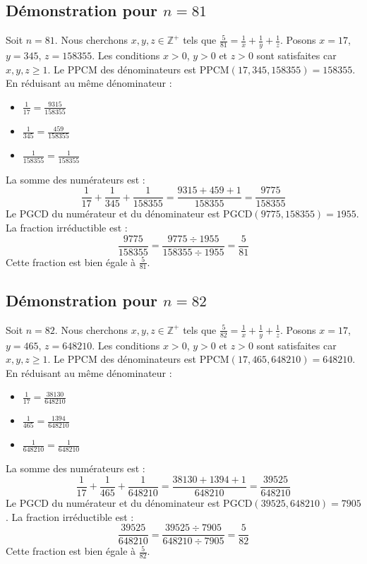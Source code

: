 \documentclass[11pt,a4paper]{article}
\begin{document}
\subsection{Démonstration pour $n = 81$}
Soit $n = 81$. Nous cherchons $x, y, z \in \mathbb{Z}^{+}$ tels que $\frac{5}{81} = \frac{1}{x} + \frac{1}{y} + \frac{1}{z}$.
Posons $x = 17$, $y = 345$, $z = 158355$.
Les conditions $x > 0$, $y > 0$ et $z > 0$ sont satisfaites car $x, y, z \geq 1$.
Le PPCM des dénominateurs est $\text{PPCM}(17, 345, 158355) = 158355$.
En réduisant au même dénominateur :
\begin{itemize}
    \item $\frac{1}{17} = \frac{9315}{158355}$
    \item $\frac{1}{345} = \frac{459}{158355}$
    \item $\frac{1}{158355} = \frac{1}{158355}$
\end{itemize}
La somme des numérateurs est :
$$ \frac{1}{17} + \frac{1}{345} + \frac{1}{158355} = \frac{9315 + 459 + 1}{158355} = \frac{9775}{158355} $$
Le PGCD du numérateur et du dénominateur est $\text{PGCD}(9775, 158355) = 1955$.
La fraction irréductible est :
$$ \frac{9775}{158355} = \frac{9775 \div 1955}{158355 \div 1955} = \frac{5}{81} $$
Cette fraction est bien égale à $\frac{5}{81}$.

\subsection{Démonstration pour $n = 82$}
Soit $n = 82$. Nous cherchons $x, y, z \in \mathbb{Z}^{+}$ tels que $\frac{5}{82} = \frac{1}{x} + \frac{1}{y} + \frac{1}{z}$.
Posons $x = 17$, $y = 465$, $z = 648210$.
Les conditions $x > 0$, $y > 0$ et $z > 0$ sont satisfaites car $x, y, z \geq 1$.
Le PPCM des dénominateurs est $\text{PPCM}(17, 465, 648210) = 648210$.
En réduisant au même dénominateur :
\begin{itemize}
    \item $\frac{1}{17} = \frac{38130}{648210}$
    \item $\frac{1}{465} = \frac{1394}{648210}$
    \item $\frac{1}{648210} = \frac{1}{648210}$
\end{itemize}
La somme des numérateurs est :
$$ \frac{1}{17} + \frac{1}{465} + \frac{1}{648210} = \frac{38130 + 1394 + 1}{648210} = \frac{39525}{648210} $$
Le PGCD du numérateur et du dénominateur est $\text{PGCD}(39525, 648210) = 7905$.
La fraction irréductible est :
$$ \frac{39525}{648210} = \frac{39525 \div 7905}{648210 \div 7905} = \frac{5}{82} $$
Cette fraction est bien égale à $\frac{5}{82}$.
\end{document}
